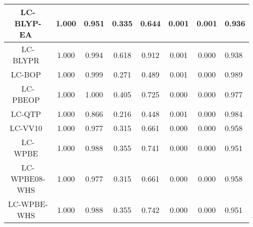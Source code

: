 \begin{tabular}{|c|c|c|c|c|c|c|l|}
              LC-BLYP-EA~\cite{Anderson2017_1656,Tawada2004_8425} &                1.000 &                          0.951 &             0.335 &                        0.644 &                0.001 &                0.001 &                       0.936 \\ \hline
                                      LC-BLYPR~\cite{Ai2021_1207} &                1.000 &                          0.994 &             0.618 &                        0.912 &                0.001 &                0.000 &                       0.938 \\ \hline
                                    LC-BOP~\cite{Song2007_154105} &                1.000 &                          0.999 &             0.271 &                        0.489 &                0.001 &                0.000 &                       0.989 \\ \hline
                                  LC-PBEOP~\cite{Tawada2004_8425} &                1.000 &                          1.000 &             0.405 &                        0.725 &                0.000 &                0.000 &                       0.977 \\ \hline
                                 LC-QTP~\cite{Haiduke2018_184106} &                1.000 &                          0.866 &             0.216 &                        0.448 &                0.001 &                0.000 &                       0.984 \\ \hline
                                 LC-VV10~\cite{Vydrov2010_244103} &                1.000 &                          0.977 &             0.315 &                        0.661 &                0.000 &                0.000 &                       0.958 \\ \hline
                                 LC-WPBE~\cite{Vydrov2006_234109} &                1.000 &                          0.988 &             0.355 &                        0.741 &                0.000 &                0.000 &                       0.951 \\ \hline
      LC-WPBE08-WHS~\cite{Weintraub2009_754,Henderson2008_194105} &                1.000 &                          0.977 &             0.315 &                        0.661 &                0.000 &                0.000 &                       0.958 \\ \hline
        LC-WPBE-WHS~\cite{Weintraub2009_754,Henderson2008_194105} &                1.000 &                          0.988 &             0.355 &                        0.742 &                0.000 &                0.000 &                       0.951 \\ \hline

\end{tabular}
